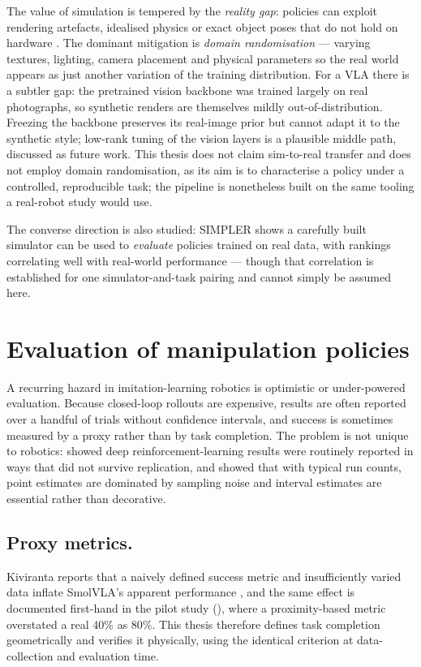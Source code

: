 The value of simulation is tempered by the \emph{reality gap}: policies can exploit
rendering artefacts, idealised physics or exact object poses that do not hold on
hardware \parencite{zhao2020sim2real}. The dominant mitigation is \emph{domain
randomisation} \parencite{tobin2017domainrand} --- varying textures, lighting, camera
placement and physical parameters so the real world appears as just another variation of
the training distribution. For a VLA there is a subtler gap: the pretrained vision
backbone was trained largely on real photographs, so synthetic renders are themselves
mildly out-of-distribution. Freezing the backbone preserves its real-image prior but
cannot adapt it to the synthetic style; low-rank tuning of the vision layers
\parencite{hu2022lora} is a plausible middle path, discussed as future work. This thesis
does not claim sim-to-real transfer and does not employ domain randomisation, as its aim
is to characterise a policy under a controlled, reproducible task; the pipeline is
nonetheless built on the same tooling a real-robot study would use.

The converse direction is also studied: SIMPLER shows a carefully built simulator can be
used to \emph{evaluate} policies trained on real data, with rankings correlating well
with real-world performance \parencite{li2024simpler} --- though that correlation is
established for one simulator-and-task pairing and cannot simply be assumed here.

\section{Evaluation of manipulation policies}
\label{sec:bg-eval}
A recurring hazard in imitation-learning robotics is optimistic or under-powered
evaluation. Because closed-loop rollouts are expensive, results are often reported over
a handful of trials without confidence intervals, and success is sometimes measured by a
proxy rather than by task completion. The problem is not unique to robotics:
\textcite{henderson2018matters} showed deep reinforcement-learning results were routinely
reported in ways that did not survive replication, and \textcite{agarwal2021precipice}
showed that with typical run counts, point estimates are dominated by sampling noise and
interval estimates are essential rather than decorative.

\subsection{Proxy metrics.} Kiviranta reports that a naively defined success metric and
insufficiently varied data inflate SmolVLA's apparent performance
\parencite{kiviranta2025smolvla}, and the same effect is documented first-hand in the
pilot study (), where a proximity-based metric overstated a
real 40\% as 80\%. This thesis therefore defines task completion geometrically and
verifies it physically, using the identical criterion at data-collection and evaluation
time.

